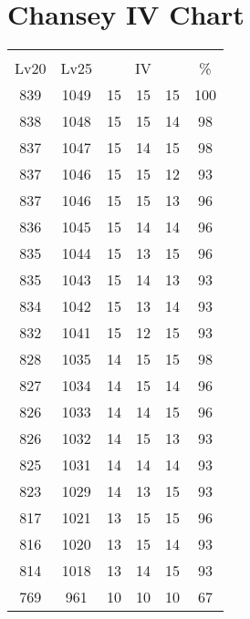 \documentclass{article}%
\begin{document}
%
\normalsize%
\section{Chansey IV Chart}%
\label{sec:Chansey IV Chart}%
\renewcommand{\arraystretch}{1.5}%
\begin{tabular}{|c|c|c|c|c|c|}%
\hline%
\multicolumn{6}{|c|}{\textcolor{white}{ 
\linebreak{Chansey}
}%
\cellcolor{black}}\\%
\multicolumn{1}{|c}{Lv20}&\multicolumn{1}{c|}{Lv25}&\multicolumn{3}{c|}{IV}&\multicolumn{1}{|c|}{\%}\\%
\hline%
\rowcolor{color100}%
839&1049&15&15&15&100\\%
\hline%
\rowcolor{color98}%
838&1048&15&15&14&98\\%
\hline%
\rowcolor{color98}%
837&1047&15&14&15&98\\%
\hline%
\rowcolor{color93}%
837&1046&15&15&12&93\\%
\hline%
\rowcolor{color96}%
837&1046&15&15&13&96\\%
\hline%
\rowcolor{color96}%
836&1045&15&14&14&96\\%
\hline%
\rowcolor{color96}%
835&1044&15&13&15&96\\%
\hline%
\rowcolor{color93}%
835&1043&15&14&13&93\\%
\hline%
\rowcolor{color93}%
834&1042&15&13&14&93\\%
\hline%
\rowcolor{color93}%
832&1041&15&12&15&93\\%
\hline%
\rowcolor{color98}%
828&1035&14&15&15&98\\%
\hline%
\rowcolor{color96}%
827&1034&14&15&14&96\\%
\hline%
\rowcolor{color96}%
826&1033&14&14&15&96\\%
\hline%
\rowcolor{color93}%
826&1032&14&15&13&93\\%
\hline%
\rowcolor{color93}%
825&1031&14&14&14&93\\%
\hline%
\rowcolor{color93}%
823&1029&14&13&15&93\\%
\hline%
\rowcolor{color96}%
817&1021&13&15&15&96\\%
\hline%
\rowcolor{color93}%
816&1020&13&15&14&93\\%
\hline%
\rowcolor{color93}%
814&1018&13&14&15&93\\%
\hline%
\rowcolor{color91}%
769&961&10&10&10&67\\%
\end{tabular}

%
\end{document}

